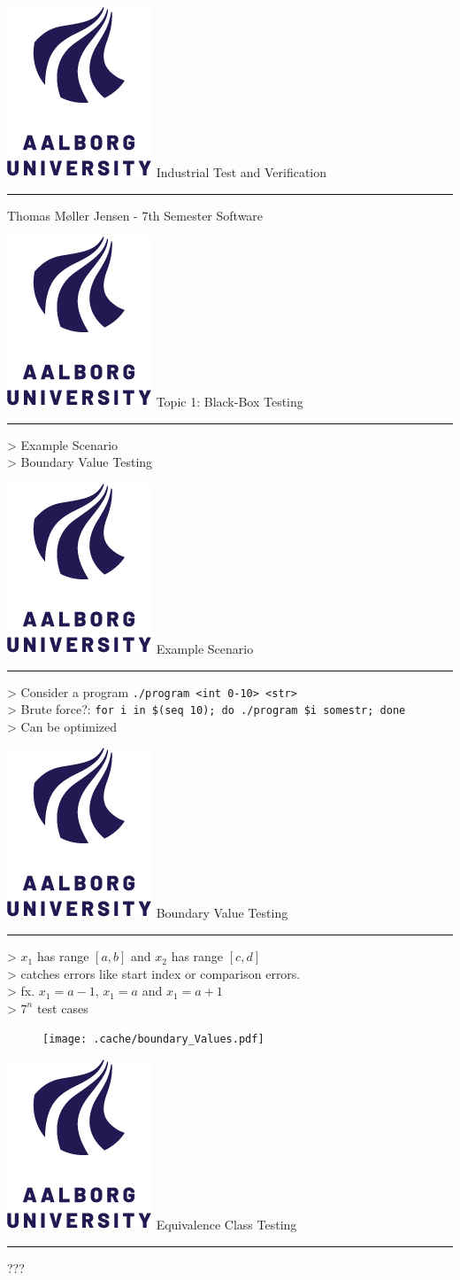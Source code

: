 \documentclass[aspectratio=1610,17pt,utf8]{beamer}
\newcommand{\mainframe}[1]{\color{blue} \includegraphics[width=.05\textwidth]{figures/aau.png} #1\\\hrule}
\newcommand{\mf}[1]{\mainframe{#1}}
\newcommand{\regularframe}[1]{\color{black}\includegraphics[width=.05\textwidth]{figures/aau.png} #1\\\hrule}
\newcommand{\rf}[1]{\regularframe{#1}}
\begin{document}
\begin{frame}{\mf{Industrial Test and Verification}}
    Thomas Møller Jensen - 7th Semester Software
\end{frame}


\begin{frame}{\mf{Topic 1: Black-Box Testing}}
    > Example Scenario\\
    > Boundary Value Testing\\
\end{frame}

\begin{frame}{\rf{Example Scenario}}
    > Consider a program \tiny\texttt{./program <int 0-10> <str>}\normalsize\\
    > Brute force?: \tiny\texttt{for i in \$(seq 10); do ./program \$i somestr; done}\normalsize\\
    > Can be optimized
\end{frame}

\begin{frame}{\rf{Boundary Value Testing}}
    \begin{minipage}{.45\textwidth}
        > $x_1$ has range $[a, b]$ and $x_2$ has range $[c, d]$\\
        > catches errors like start index or comparison errors.\\
        > fx. $x_1 = a-1$, $x_1 = a$ and $x_1 = a+1$\\
        > $7^n$ test cases
    \end{minipage}
    \begin{minipage}{.5\textwidth}
        \begin{figure}
            \texttt{[image: .cache/boundary\_Values.pdf]}
        \end{figure}
\end{minipage}
\end{frame}

\begin{frame}{\rf{Equivalence Class Testing}}
    ???
\end{frame}
\end{document}
